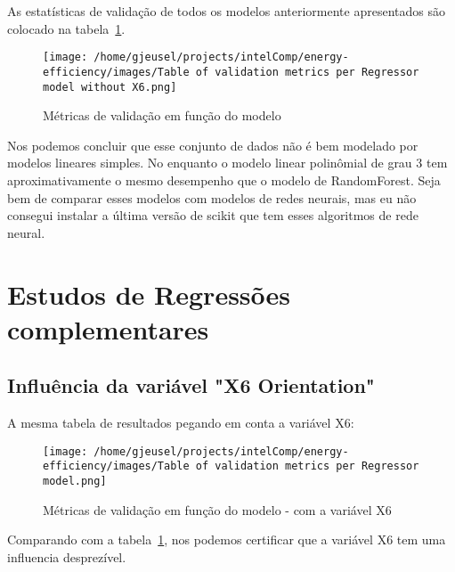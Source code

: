 \documentclass[paper=a4, fontsize=11pt]{article} %
\numberwithin{equation}{section} %
\numberwithin{figure}{section} %
\numberwithin{table}{section} %
\begin{document}
As estatísticas de validação de todos os modelos anteriormente apresentados são colocado na tabela~\ref{table_all_results}.

\begin{figure}[H] %
\begin{center}
\texttt{[image: /home/gjeusel/projects/intelComp/energy-efficiency/images/Table of validation metrics per Regressor model without X6.png]}
\end{center}
\caption{Métricas de validação em função do modelo}
\label{table_all_results}
\end{figure}

Nos podemos concluir que esse conjunto de dados não é bem modelado por modelos lineares simples.
No enquanto o modelo linear polinômial de grau 3 tem aproximativamente o mesmo desempenho que o modelo de RandomForest.
Seja bem de comparar esses modelos com modelos de redes neurais, mas eu não consegui instalar a última versão de scikit que tem esses algoritmos de rede neural.


\newpage
\section{Estudos de Regressões complementares}

\subsection{Influência da variável "X6 Orientation"}

A mesma tabela de resultados pegando em conta a variável X6:

\begin{figure}[H] %
\begin{center}
\texttt{[image: /home/gjeusel/projects/intelComp/energy-efficiency/images/Table of validation metrics per Regressor model.png]}
\end{center}
\caption{Métricas de validação em função do modelo - com a variável X6}
\label{table_all_results_withX6}
\end{figure}

Comparando com a tabela~\ref{table_all_results}, nos podemos certificar que a variável X6 tem uma influencia desprezível.


\newpage
\listoftables
\listoffigures

\newpage
\end{document}
